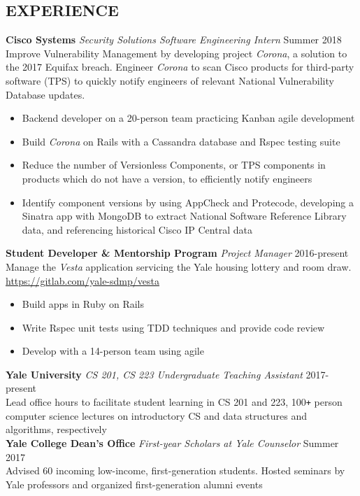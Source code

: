 \documentclass[margin, centered]{res}
\def\Plus{\texttt{+}}
\begin{document}
\begin{resume}
  \section{EXPERIENCE}
  \textbf{Cisco Systems} \textit{Security Solutions Software Engineering Intern} \hfill Summer 2018 \newline
  Improve Vulnerability Management by developing project \textit{Corona}, a solution to the 2017 Equifax breach. Engineer \textit{Corona} to scan Cisco products for third-party software (TPS) to quickly notify engineers of relevant National Vulnerability Database updates.\smallskip{}
  \begin{itemize}
      \item Backend developer on a 20-person team practicing Kanban agile development
      \item Build \textit{Corona} on Rails with a Cassandra database and Rspec testing suite
      \item Reduce the number of Versionless Components, or TPS components in products which do not have a version, to efficiently notify engineers
      \item Identify component versions by using AppCheck and Protecode, developing a Sinatra app with MongoDB to extract National Software Reference Library data, and referencing historical Cisco IP Central data
  \end{itemize}
  \textbf{Student Developer \&  Mentorship Program} \textit{Project Manager} \hfill 2016-present \\
  Manage the \textit{Vesta} application servicing the Yale housing lottery and room draw. \\ 
  \href{https://gitlab.com/yale-sdmp/vesta}{https://gitlab.com/yale-sdmp/vesta}\smallskip{}
  \begin{itemize}
    \item Build apps in Ruby on Rails
    \item Write Rspec unit tests using TDD techniques and provide code review
    \item Develop with a 14-person team using agile
  \end{itemize}
  \textbf{Yale University} \textit{CS 201, CS 223 Undergraduate Teaching Assistant} \hfill 2017-present \\
  Lead office hours to facilitate student learning in CS 201 and 223, 100\Plus{} person computer science lectures on introductory CS and data structures and algorithms, respectively \\ 
  \textbf{Yale College Dean's Office} \textit{First-year Scholars at Yale Counselor} \hfill Summer 2017 \\
  Advised 60 incoming low-income, first-generation students. Hosted seminars by Yale professors and organized first-generation alumni events


\end{resume}
\end{document}
